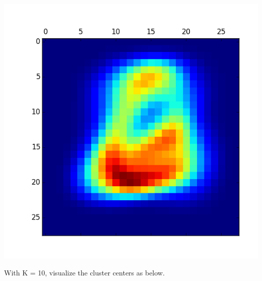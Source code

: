 \documentclass[11pt]{article}
\begin{document}
\begin{itemize}
\includegraphics[scale = 0.5]{5.png}

With K = 10, visualize the cluster centers as below.


\end{itemize}
\end{document}
